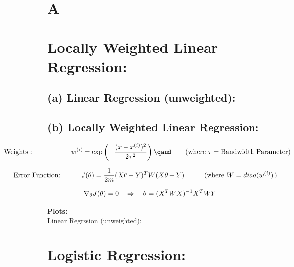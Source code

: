 \documentclass[a4 paper]{article}
\begin{document}

\section{A}

\section{Locally Weighted Linear Regression:}

\subsection*{(a) Linear Regression (unweighted):}



\subsection*{(b) Locally Weighted Linear Regression:}
\vspace*{0.3cm}
$$ \hspace*{-2.5cm}\text{Weights}: \hspace*{1.9cm} w^{(i)} = \exp\left(-\frac{(x-x^{(i)})^2}{2\tau^2}\right) \qaud \quad \quad (\text{where } \tau = \text{Bandwidth Parameter}) $$

$$ \hspace*{-2.7cm} \text{Error Function: } \hspace*{0.9cm} J(\theta) = \frac{1}{2m} (X\theta - Y)^TW(X\theta - Y) \hspace*{1cm} (\text{where } W = diag(w^{(i)}) \hspace*{0.5mm}) $$


$$ \hspace*{-5.8cm} \text{Minima:} \hspace*{2.3cm} \nabla_{\theta}J(\theta) = 0 \quad \Rightarrow \quad \theta = (X^TWX)^{-1}X^TWY $$

\vspace*{0.3cm}
\hspace*{-0.2cm}
\textbf{Plots:}\\

\hspace*{-0.2cm}
Linear Regrssion (unweighted):

\section{Logistic Regression:}
\vspace*{0.3cm}
\end{document}
